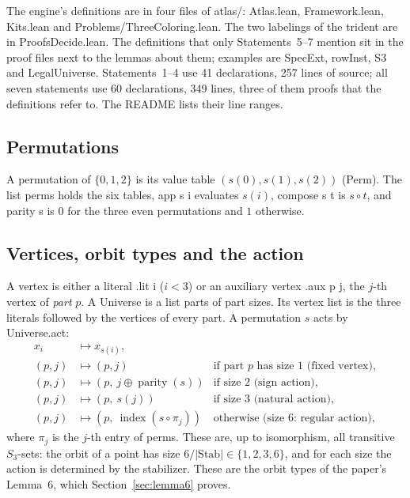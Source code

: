 \documentclass[11pt,a4paper]{article}
\newcommand{\leanus}{\textunderscore\allowbreak}
\newcommand{\lean}[1]{{\ttfamily\let\_\leanus #1}}
\theoremstyle{definition}
\begin{document}
The engine's definitions are in four files of \lean{atlas/}:
\lean{Atlas.lean}, \lean{Framework.lean}, \lean{Kits.lean} and
\lean{Problems/ThreeColoring.lean}. The two labelings of the trident are in
\lean{ProofsDecide.lean}. The definitions that only Statements~5--7 mention
sit in the proof files next to the lemmas about them; examples are
\lean{SpecExt}, \lean{rowInst}, \lean{S3} and \lean{LegalUniverse}.
Statements~1--4 use 41 declarations, 257 lines of source; all seven
statements use 60 declarations, 349 lines, three of them proofs that the
definitions refer to. The README lists their line ranges.

\subsection{Permutations}
A permutation of $\{0,1,2\}$ is its value table $(s(0),s(1),s(2))$
(\lean{Perm}). The list \lean{perms} holds the six tables,
\lean{app s i} evaluates $s(i)$, \lean{compose s t} is $s\circ t$, and
\lean{parity s} is $0$ for the three even permutations and $1$ otherwise.

\subsection{Vertices, orbit types and the action}\label{sec:action}
A vertex is either a literal \lean{.lit i} ($i<3$) or an auxiliary vertex
\lean{.aux p j}, the $j$-th vertex of \emph{part} $p$. A \lean{Universe} is a
list \lean{parts} of part sizes. Its vertex list is the three literals
followed by the vertices of every part. A permutation $s$ acts by
\lean{Universe.act}:
\[
\begin{array}{lll}
x_i &\mapsto x_{s(i)}, & \\
(p,j) &\mapsto (p,j) & \text{if part $p$ has size 1 (fixed vertex)},\\
(p,j) &\mapsto (p,\ j\oplus \operatorname{parity}(s)) & \text{if size 2 (sign action)},\\
(p,j) &\mapsto (p,\ s(j)) & \text{if size 3 (natural action)},\\
(p,j) &\mapsto (p,\ \operatorname{index}(s\circ \pi_j)) & \text{otherwise (size 6: regular action)},
\end{array}
\]
where $\pi_j$ is the $j$-th entry of \lean{perms}. These are, up to
isomorphism, all transitive $S_3$-sets: the orbit of a point has size
$6/|\mathrm{Stab}|\in\{1,2,3,6\}$, and for each size the action is
determined by the stabilizer. These are the orbit types of the paper's
Lemma~6, which Section~\ref{sec:lemma6} proves.
\end{document}
